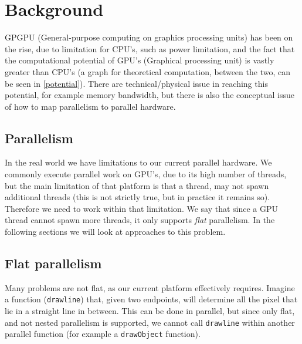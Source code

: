 \section{Background}
GPGPU (General-purpose computing on graphics processing units) has been on the rise, due to limitation for CPU's, such as power limitation, and the fact that the computational potential of GPU's (Graphical processing unit) is vastly greater than CPU's \cite{cpu-vs-gpu} (a graph for theoretical computation, between the two, can be seen in \ref{potential}). There are technical/physical issue in reaching this potential, for example memory bandwidth, but there is also the conceptual issue of how to map parallelism to parallel hardware.
\begin{comment}
A common way to increase computer performance, is to increase the capacity for parallelism. For practical usage, however, this is difficult to implement, due to low-level GPU-specific languages requiring domain specific knowledge to make full use of that capacity. A vast amount of work has gone into transforming high-level hardware-agnostic code into these low-level GPU-specific languages \cite{inc-flat}. 
\end{comment}

\subsection{Parallelism} 
In the real world we have limitations to our current parallel hardware. We commonly execute parallel work on GPU's, due to its high number of threads, but the main limitation of that platform is that a thread, may not spawn additional threads (this is not strictly true, but in practice it remains so). Therefore we need to work within that limitation. We say that since a GPU thread cannot spawn more threads, it only supports \textit{flat} parallelism. In the following sections we will look at approaches to this problem.    

\subsection{Flat parallelism}
Many problems are not flat, as our current platform effectively requires. Imagine a function (\texttt{drawline}) that, given two endpoints, will determine all the pixel that lie in a straight line in between. This can be done in parallel, but since only flat, and not nested parallelism is supported, we cannot call \texttt{drawline} within another parallel function (for example a \texttt{drawObject} function). 

